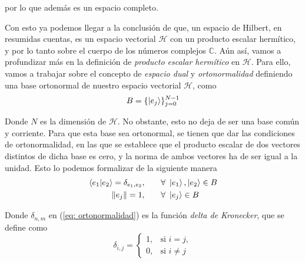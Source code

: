 \documentclass{article}
\numberwithin{equation}{section} %
\begin{document}
    \vspace{1.5mm}

    por lo que además es un espacio completo.

    \vspace{5mm}

    Con esto ya podemos llegar a la conclusión de que, un espacio de Hilbert, en resumidas cuentas, es un espacio vectorial \( \mathcal{H} \) con un producto escalar hermítico, y por lo tanto sobre el cuerpo de los números complejos \( \mathbb{C} \). Aún así, vamos a profundizar más en la definición de \textit{producto escalar hermítico} en \( \mathcal{H} \). Para ello, vamos a trabajar sobre el concepto de \textit{espacio dual} y \textit{ortonormalidad} definiendo una base ortonormal de nuestro espacio vectorial \( \mathcal{H} \), como
    \begin{equation}
        B = \{ \ket{e_{j}} \} _{j = 0}^{N - 1}
        \label{eq: base_ortonormal_H}
    \end{equation}

    \vspace{1.5mm}

    Donde \( N \) es la dimensión de \( \mathcal{H} \). No obstante, esto no deja de ser una base común y corriente. Para que esta base sea ortonormal, se tienen que dar las condiciones de ortonormalidad, en las que se establece que el producto escalar de dos vectores distintos de dicha base es cero, y la norma de ambos vectores ha de ser igual a la unidad. Esto lo podemos formalizar de la siguiente manera
    \begin{align}
        \braket{e_{1} | e_{2}} = \delta_{e_{1}, e_{2}}, \qquad &\forall \ \ket{e_{1}}, \ket{e_{2}} \in B \label{eq: ortonormalidad} \\
        \| e_{j} \| = 1,  \qquad &\forall \ \ket{e_{j}} \in B \label{eq: linealidad}
    \end{align}
    
    \vspace{1.5mm}

    Donde \( \delta_{n, m} \) en (\ref{eq: ortonormalidad}) es la función \textit{delta de Kronecker}, que se define como
    \begin{equation}
        \delta_{i, j} = 
        \begin{cases}
            1, & \text{si } i = j, \\
            0, & \text{si } i \neq j
        \end{cases}
        \label{eq: delta_kronecker}
    \end{equation}
\end{document}

